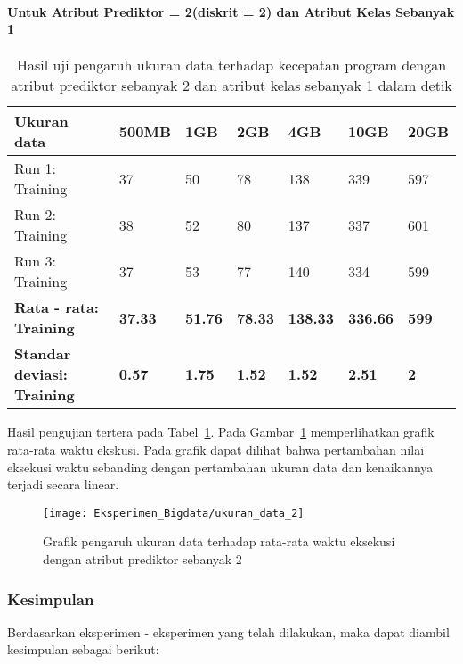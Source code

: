 \paragraph{Untuk Atribut Prediktor = 2(diskrit = 2) dan Atribut Kelas Sebanyak 1}

\begin{table}[H]
\label{tab:uji pengaruh ukuran data atr 2}
\centering
\caption{Hasil uji pengaruh ukuran data terhadap kecepatan program dengan atribut prediktor sebanyak 2 dan atribut kelas sebanyak 1 dalam detik}
\begin{tabular}{ | l | l | l | l | l | l | l | }
\hline
Ukuran data & 500MB & 1GB & 2GB & 4GB & 10GB & 20GB \\ \hline \hline
Run 1: Training & 37 & 50 & 78 & 138 & 339 & 597  \\ \hline
Run 2: Training & 38 & 52 & 80 & 137 & 337 & 601  \\ \hline
Run 3: Training & 37 & 53 & 77 & 140 & 334 & 599  \\ \hline
\textbf{Rata - rata: Training} & \textbf{37.33} & \textbf{51.76} & \textbf{78.33} & \textbf{138.33} & \textbf{336.66} & \textbf{599} \\ \hline
\textbf{Standar deviasi: Training} & \textbf{0.57} & \textbf{1.75} & \textbf{1.52} & \textbf{1.52} & \textbf{2.51} & \textbf{2} \\ \hline
\end{tabular}
\end{table}

Hasil pengujian tertera pada Tabel~\ref{tab:uji pengaruh ukuran data atr 2}. Pada Gambar~\ref{fig:Grafik pengaruh ukuran data terhadap rata-rata waktu eksekusi atr 2} memperlihatkan grafik rata-rata waktu ekskusi. Pada grafik dapat dilihat bahwa pertambahan nilai eksekusi waktu sebanding dengan pertambahan ukuran data dan kenaikannya terjadi secara linear.

\begin{figure}[H]
	\centering
	\texttt{[image: Eksperimen\_Bigdata/ukuran\_data\_2]}
	\caption[Grafik pengaruh ukuran data terhadap rata-rata waktu eksekusi dengan atribut prediktor sebanyak 2]{Grafik pengaruh ukuran data terhadap rata-rata waktu eksekusi dengan atribut prediktor sebanyak 2}
	\label{fig:Grafik pengaruh ukuran data terhadap rata-rata waktu eksekusi atr 2}
\end{figure}

\subsubsection{Kesimpulan}
Berdasarkan eksperimen - eksperimen yang telah dilakukan, maka dapat diambil kesimpulan sebagai berikut:

